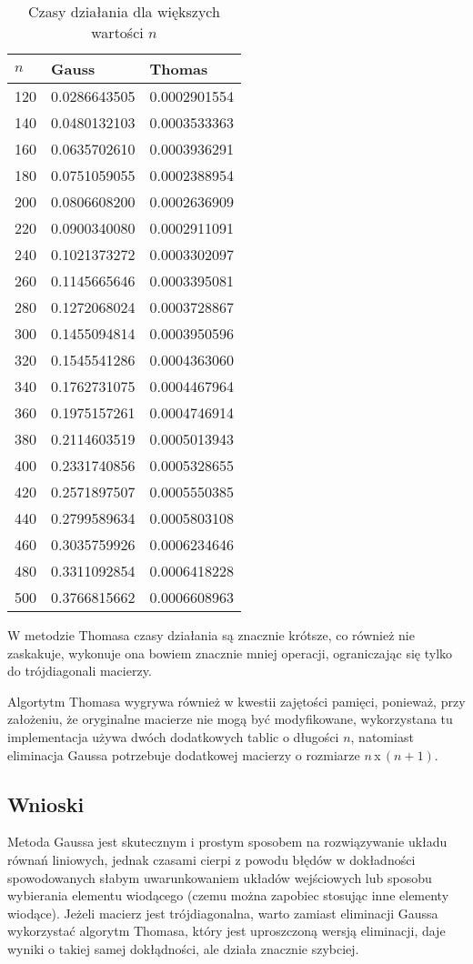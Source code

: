 \documentclass{article}
\begin{document}
\begin{table}[H]
\centering
\begin{tabular}{|l|l|l|}
\hline
$n$ & Gauss & Thomas \\ \hline
120 & 0.0286643505 & 0.0002901554 \\ \hline
140 & 0.0480132103 & 0.0003533363 \\ \hline
160 & 0.0635702610 & 0.0003936291 \\ \hline
180 & 0.0751059055 & 0.0002388954 \\ \hline
200 & 0.0806608200 & 0.0002636909 \\ \hline
220 & 0.0900340080 & 0.0002911091 \\ \hline
240 & 0.1021373272 & 0.0003302097 \\ \hline
260 & 0.1145665646 & 0.0003395081 \\ \hline
280 & 0.1272068024 & 0.0003728867 \\ \hline
300 & 0.1455094814 & 0.0003950596 \\ \hline
320 & 0.1545541286 & 0.0004363060 \\ \hline
340 & 0.1762731075 & 0.0004467964 \\ \hline
360 & 0.1975157261 & 0.0004746914 \\ \hline
380 & 0.2114603519 & 0.0005013943 \\ \hline
400 & 0.2331740856 & 0.0005328655 \\ \hline
420 & 0.2571897507 & 0.0005550385 \\ \hline
440 & 0.2799589634 & 0.0005803108 \\ \hline
460 & 0.3035759926 & 0.0006234646 \\ \hline
480 & 0.3311092854 & 0.0006418228 \\ \hline
500 & 0.3766815662 & 0.0006608963 \\ \hline
\end{tabular}
\caption{Czasy działania dla większych wartości $n$}
\end{table}

W metodzie Thomasa czasy działania są znacznie krótsze, co również nie zaskakuje, wykonuje ona bowiem znacznie mniej operacji, ograniczając
się tylko do trójdiagonali macierzy.

Algortytm Thomasa wygrywa również w kwestii zajętości pamięci, ponieważ, przy założeniu, że oryginalne macierze nie mogą być
modyfikowane, wykorzystana tu implementacja używa dwóch dodatkowych tablic o długości $n$, natomiast eliminacja Gaussa potrzebuje
dodatkowej macierzy o rozmiarze $n$\,x\,$(n+1)$.

\subsection{Wnioski}
Metoda Gaussa jest skutecznym i prostym sposobem na rozwiązywanie układu równań liniowych, jednak czasami cierpi z powodu 
błędów w dokładności spowodowanych słabym uwarunkowaniem układów wejściowych lub sposobu wybierania elementu wiodącego (czemu 
można zapobiec stosując inne elementy wiodące). Jeżeli macierz jest trójdiagonalna, warto zamiast 
eliminacji Gaussa wykorzystać algorytm Thomasa, który jest uproszczoną wersją eliminacji, daje wyniki o takiej samej dokłądności,
ale działa znacznie szybciej.
\end{document}
